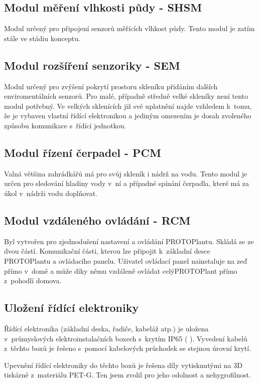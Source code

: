\subsection{Modul měření vlhkosti půdy - SHSM}
\label{subsec:SHSM}
Modul určený pro připojení senzorů měřících vlhkost půdy.
Tento modul je zatím stále ve stádiu konceptu.

\subsection{Modul rozšíření senzoriky - SEM}
\label{subsec:SEM}
Modul určený pro zvýšení pokrytí prostoru skleníku přidáním dalších enviromentálních senzorů.
Pro malé, případně středně velké skleníky není tento modul potřebný. 
Ve velkých sklenících již své uplatnění najde vzhledem k~tomu, že je vybaven vlastní řídící elektronikou a jediným omezením je dosah zvoleného způsobu komunikace s~řídící jednotkou.

\subsection{Modul řízení čerpadel - PCM}
\label{subsec:PCM}
Valná většina zahrádkářů má pro svůj skleník i nádrž na vodu.
Tento modul je určen pro sledování hladiny vody v~ní a případné spínání čerpadla, které má za úkol v~nádrži vodu doplňovat.

\subsection{Modul vzdáleného ovládání - RCM}
\label{subsec:RCM}
Byl vytvořen pro zjednodušení nastavení a ovládání PROTOPlantu.
Skládá se ze dvou částí. 
Komunikační části, kterou lze připojit k~základní desce PROTOPlantu a ovládacího panelu. 
Uživatel ovládací panel nainstaluje na zeď přímo v~domě a může díky němu vzdáleně ovládat celýPROTOPlant přímo z~pohodlí domova. 

\subsection{Uložení řídící elektroniky}
Řídící elektronika (základní deska, řadiče, kabeláž atp.) je uložena v~průmyslových elektroinstalačních boxech s~krytím IP65 ( \cite{IP_ratings}).
Vyvedení kabelů z~těchto boxů je řešeno s~pomocí kabelových průchodek se stejnou úrovní krytí.

Upevnění řídící elektroniky do těchto boxů je řešena díly vytisknutými na 3D tiskárně z~materiálu PET-G.
Ten jsem zvolil pro jeho odolnost a nehygrofilnost.

